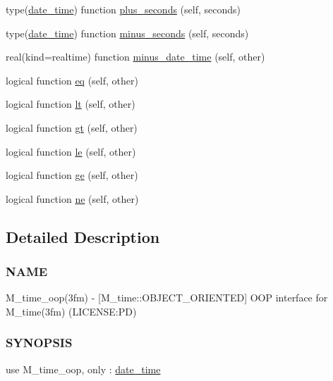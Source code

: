 \begin{DoxyCompactItemize}
type(\mbox{\hyperlink{structm__time__oop_1_1date__time}{date\+\_\+time}}) function \mbox{\hyperlink{namespacem__time__oop_a6830c1cce303ec401ac8e4333a5a73d4}{plus\+\_\+seconds}} (self, seconds)
\item 
type(\mbox{\hyperlink{structm__time__oop_1_1date__time}{date\+\_\+time}}) function \mbox{\hyperlink{namespacem__time__oop_a395fbf19c6617641aea39c33fd4b2087}{minus\+\_\+seconds}} (self, seconds)
\item 
real(kind=realtime) function \mbox{\hyperlink{namespacem__time__oop_a3da83a42a8f957db9bd2f6f0b942ab99}{minus\+\_\+date\+\_\+time}} (self, other)
\item 
logical function \mbox{\hyperlink{namespacem__time__oop_afcc34853af3eda020eb5ff802e04964d}{eq}} (self, other)
\item 
logical function \mbox{\hyperlink{namespacem__time__oop_ab0c5ce86d25993804501d59a8106818f}{lt}} (self, other)
\item 
logical function \mbox{\hyperlink{namespacem__time__oop_a753692f18b6cd100401603d0b88d7c3c}{gt}} (self, other)
\item 
logical function \mbox{\hyperlink{namespacem__time__oop_a5e04ff772ac6d72f68031ec43c1e6c84}{le}} (self, other)
\item 
logical function \mbox{\hyperlink{namespacem__time__oop_aeea1131ab511b897168f00a908b75458}{ge}} (self, other)
\item 
logical function \mbox{\hyperlink{namespacem__time__oop_a7707a7cbd4869301a613ceeb12ed2384}{ne}} (self, other)
\end{DoxyCompactItemize}


\subsection{Detailed Description}
\subsubsection*{N\+A\+ME}

M\+\_\+time\+\_\+oop(3fm) -\/ \mbox{[}M\+\_\+time\+::\+O\+B\+J\+E\+C\+T\+\_\+\+O\+R\+I\+E\+N\+T\+ED\mbox{]} O\+OP interface for M\+\_\+time(3fm) (L\+I\+C\+E\+N\+SE\+:PD) 

\subsubsection*{S\+Y\+N\+O\+P\+S\+IS}

use M\+\_\+time\+\_\+oop, only \+: \mbox{\hyperlink{structm__time__oop_1_1date__time}{date\+\_\+time}}

